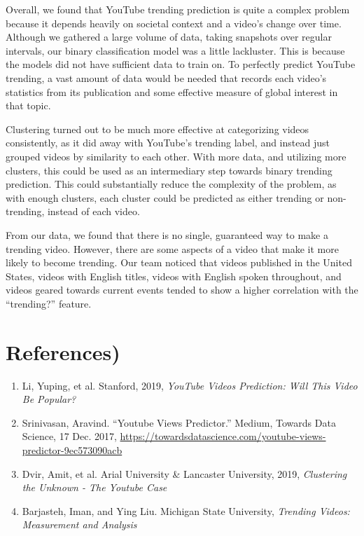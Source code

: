 \documentclass{article}
\begin{document}
\quad Overall, we found that YouTube trending prediction is quite a complex problem because it depends heavily on societal context and a video’s change over time. Although we gathered a large volume of data, taking snapshots over regular intervals, our binary classification model was a little lackluster. This is because the models did not have sufficient data to train on. To perfectly predict YouTube trending, a vast amount of data would be needed that records each video’s statistics from its publication and some effective measure of global interest in that topic.
\par Clustering turned out to be much more effective at categorizing videos consistently, as it did away with YouTube’s trending label, and instead just grouped videos by similarity to each other. With more data, and utilizing more clusters, this could be used as an intermediary step towards binary trending prediction. This could substantially reduce the complexity of the problem, as with enough clusters, each cluster could be predicted as either trending or non-trending, instead of each video.
\par From our data, we found that there is no single, guaranteed way to make a trending video. However, there are some aspects of a video that make it more likely to become trending. Our team noticed that videos published in the United States, videos with English titles, videos with English spoken throughout, and videos geared towards current events tended to show a higher correlation with the “trending?” feature.


\section*{References)}
\begin{enumerate}
  \item Li, Yuping, et al. Stanford, 2019, \textit{YouTube Videos Prediction: Will This Video Be Popular?} 
  \item Srinivasan, Aravind. “Youtube Views Predictor.” Medium, Towards Data Science, 17 Dec. 2017, \href{https://towardsdatascience.com/youtube-views-predictor-9ec573090acb}{https://towardsdatascience.com/youtube-views-predictor-9ec573090acb}
  \item Dvir, Amit, et al. Arial University \& Lancaster University, 2019, \textit{Clustering the Unknown - The Youtube Case}
  \item Barjasteh, Iman, and Ying Liu. Michigan State University, \textit{Trending Videos: Measurement and Analysis}
\end{enumerate}
\end{document}
